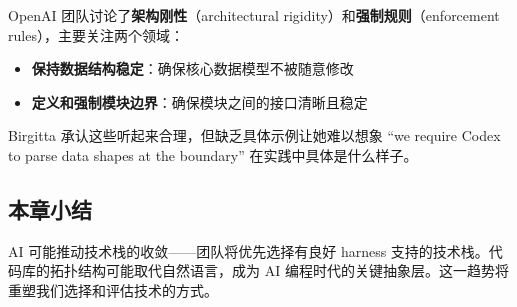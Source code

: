 OpenAI 团队讨论了\textbf{架构刚性}（architectural rigidity）和\textbf{强制规则}（enforcement rules），主要关注两个领域：

\begin{itemize}[leftmargin=1.5em]
    \item \textbf{保持数据结构稳定}：确保核心数据模型不被随意修改
    \item \textbf{定义和强制模块边界}：确保模块之间的接口清晰且稳定
\end{itemize}

Birgitta 承认这些听起来合理，但缺乏具体示例让她难以想象 ``we require Codex to parse data shapes at the boundary'' 在实践中具体是什么样子。

\subsection{本章小结}

AI 可能推动技术栈的收敛------团队将优先选择有良好 harness 支持的技术栈。代码库的拓扑结构可能取代自然语言，成为 AI 编程时代的关键抽象层。这一趋势将重塑我们选择和评估技术的方式。

\newpage

